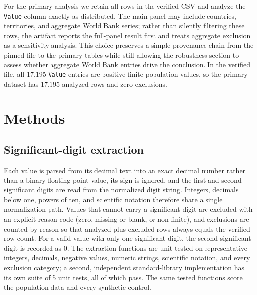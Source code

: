 \documentclass[sigconf,nonacm]{acmart}
\begin{document}
For the primary analysis we retain all rows in the verified CSV and analyze the \texttt{Value} column exactly as distributed. The main panel may include countries, territories, and aggregate World Bank series; rather than silently filtering these rows, the artifact reports the full-panel result first and treats aggregate exclusion as a sensitivity analysis. This choice preserves a simple provenance chain from the pinned file to the primary tables while still allowing the robustness section to assess whether aggregate World Bank entries drive the conclusion. In the verified file, all 17,195 \texttt{Value} entries are positive finite population values, so the primary dataset has 17,195 analyzed rows and zero exclusions.

\section{Methods}
\label{sec:methods}

\subsection{Significant-digit extraction}
Each value is parsed from its decimal text into an exact decimal number rather than a binary floating-point value, its sign is ignored, and the first and second significant digits are read from the normalized digit string. Integers, decimals below one, powers of ten, and scientific notation therefore share a single normalization path. Values that cannot carry a significant digit are excluded with an explicit reason code (zero, missing or blank, or non-finite), and exclusions are counted by reason so that analyzed plus excluded rows always equals the verified row count. For a valid value with only one significant digit, the second significant digit is recorded as 0. The extraction functions are unit-tested on representative integers, decimals, negative values, numeric strings, scientific notation, and every exclusion category; a second, independent standard-library implementation has its own suite of 5 unit tests, all of which pass. The same tested functions score the population data and every synthetic control.
\end{document}
